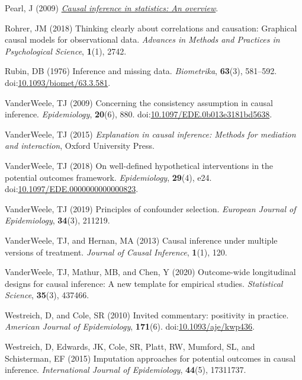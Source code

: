 \documentclass[
  singlecolumn]{article}
\newlength{\cslhangindent}
\newenvironment{CSLReferences}[2] %
 {\begin{list}{}{%
  \setlength{\itemindent}{0pt}
  \setlength{\leftmargin}{0pt}
  \setlength{\parsep}{0pt}
  \ifodd #1
   \setlength{\leftmargin}{\cslhangindent}
   \setlength{\itemindent}{-1\cslhangindent}
  \fi
  \setlength{\itemsep}{#2\baselineskip}}}
 {\end{list}}
\begin{document}
\begin{CSLReferences}{1}{0}
Pearl, J (2009) \emph{\href{https://doi.org/10.1214/09-SS057}{Causal
inference in statistics: An overview}}.

Rohrer, JM (2018) Thinking clearly about correlations and causation:
Graphical causal models for observational data. \emph{Advances in
Methods and Practices in Psychological Science}, \textbf{1}(1), 2742.

Rubin, DB (1976) Inference and missing data. \emph{Biometrika},
\textbf{63}(3), 581--592.
doi:\href{https://doi.org/10.1093/biomet/63.3.581}{10.1093/biomet/63.3.581}.

VanderWeele, TJ (2009) Concerning the consistency assumption in causal
inference. \emph{Epidemiology}, \textbf{20}(6), 880.
doi:\href{https://doi.org/10.1097/EDE.0b013e3181bd5638}{10.1097/EDE.0b013e3181bd5638}.

VanderWeele, TJ (2015) \emph{Explanation in causal inference: Methods
for mediation and interaction}, Oxford University Press.

VanderWeele, TJ (2018) On well-defined hypothetical interventions in the
potential outcomes framework. \emph{Epidemiology}, \textbf{29}(4), e24.
doi:\href{https://doi.org/10.1097/EDE.0000000000000823}{10.1097/EDE.0000000000000823}.

VanderWeele, TJ (2019) Principles of confounder selection.
\emph{European Journal of Epidemiology}, \textbf{34}(3), 211219.

VanderWeele, TJ, and Hernan, MA (2013) Causal inference under multiple
versions of treatment. \emph{Journal of Causal Inference},
\textbf{1}(1), 120.

VanderWeele, TJ, Mathur, MB, and Chen, Y (2020) Outcome-wide
longitudinal designs for causal inference: A new template for empirical
studies. \emph{Statistical Science}, \textbf{35}(3), 437466.

Westreich, D, and Cole, SR (2010) Invited commentary: positivity in
practice. \emph{American Journal of Epidemiology}, \textbf{171}(6).
doi:\href{https://doi.org/10.1093/aje/kwp436}{10.1093/aje/kwp436}.

Westreich, D, Edwards, JK, Cole, SR, Platt, RW, Mumford, SL, and
Schisterman, EF (2015) Imputation approaches for potential outcomes in
causal inference. \emph{International Journal of Epidemiology},
\textbf{44}(5), 17311737.

\end{CSLReferences}
\end{document}
